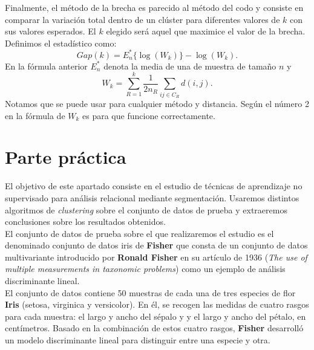 \documentclass[a4paper, 20pt]{article}
\begin{document}
Finalmente, el método de la brecha es parecido al método del codo y consiste en comparar la variación total dentro de un clúster para diferentes valores de $ k $ con sus valores esperados. El $ k $ elegido será aquel que maximice el valor de la brecha. Definimos el estadístico como:
\[
Gap(k) = E^*_n\{ \log(W_k)\} - \log(W_k).
\]
En la fórmula anterior $ E^*_n $ denota la media de una de muestra de tamaño $ n $ y 
\[
W_k = \sum_{R = 1}^{k}\frac{1}{2 n_R}\sum_{i j \in C_R} d(i,j).
\]
Notamos que se puede usar para cualquier método y distancia. Según \cite{tibshirani2001estimating} el número 2 en la fórmula de $ W_k $ es para que funcione correctamente.

\clearpage

\section{Parte práctica}

El objetivo de este apartado consiste en el estudio de técnicas de aprendizaje no supervisado para análisis relacional mediante segmentación. Usaremos distintos algoritmos de \textit{clustering} sobre el conjunto de datos de prueba y extraeremos conclusiones sobre los resultados obtenidos.\\

El conjunto de datos de prueba sobre el que realizaremos el estudio es el denominado conjunto de datos iris de \textbf{Fisher} que consta de un conjunto de datos multivariante introducido por \textbf{Ronald Fisher} en su artículo de 1936 (\textit{The use of multiple measurements in taxonomic problems}) como un ejemplo de análisis discriminante lineal.\\

El conjunto de datos contiene 50 muestras de cada una de tres especies de flor \textbf{Iris} (setosa, virginica y versicolor). En él, se recogen las medidas de cuatro rasgos para cada muestra: el largo y ancho del sépalo y y el largo y ancho del pétalo, en centímetros. Basado en la combinación de estos cuatro rasgos, \textbf{Fisher} desarrolló un modelo discriminante lineal para distinguir entre una especie y otra.\\
\end{document}
